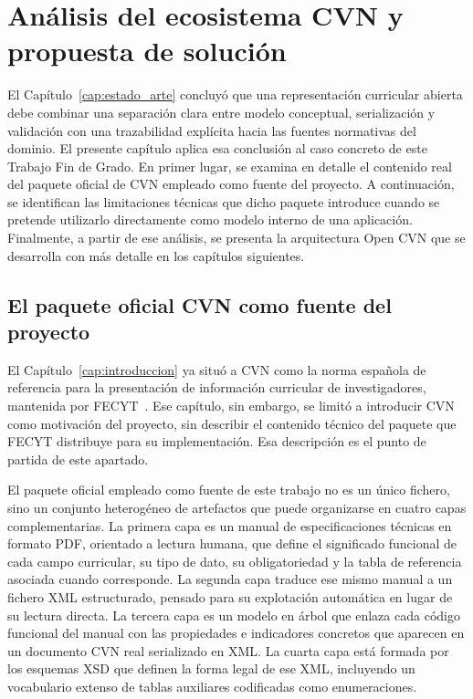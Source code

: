 \chapter{Análisis del ecosistema CVN y propuesta de solución}
\label{cap:ecosistema_cvn}

El Capítulo~\ref{cap:estado_arte} concluyó que una representación curricular
abierta debe combinar una separación clara entre modelo conceptual,
serialización y validación con una trazabilidad explícita hacia las fuentes
normativas del dominio. El presente capítulo aplica esa conclusión al caso
concreto de este Trabajo Fin de Grado. En primer lugar, se examina en detalle el
contenido real del paquete oficial de CVN empleado como fuente del proyecto. A
continuación, se identifican las limitaciones técnicas que dicho paquete
introduce cuando se pretende utilizarlo directamente como modelo interno de una
aplicación. Finalmente, a partir de ese análisis, se presenta la arquitectura
Open CVN que se desarrolla con más detalle en los capítulos siguientes.

\section{El paquete oficial CVN como fuente del proyecto}
\label{sec:ecosistema_paquete_oficial}

El Capítulo~\ref{cap:introduccion} ya situó a CVN como la norma española de
referencia para la presentación de información curricular de investigadores,
mantenida por FECYT~\cite{cvn_web}. Ese capítulo, sin embargo, se limitó a
introducir CVN como motivación del proyecto, sin describir el contenido técnico
del paquete que FECYT distribuye para su implementación. Esa descripción es el
punto de partida de este apartado.

El paquete oficial empleado como fuente de este trabajo no es un único fichero,
sino un conjunto heterogéneo de artefactos que puede organizarse en cuatro
capas complementarias. La primera capa es un manual de especificaciones técnicas
en formato PDF, orientado a lectura humana, que define el significado funcional
de cada campo curricular, su tipo de dato, su obligatoriedad y la tabla de
referencia asociada cuando corresponde. La segunda capa traduce ese mismo manual
a un fichero XML estructurado, pensado para su explotación automática en lugar
de su lectura directa. La tercera capa es un modelo en árbol que enlaza cada
código funcional del manual con las propiedades e indicadores concretos que
aparecen en un documento CVN real serializado en XML. La cuarta capa está
formada por los esquemas XSD que definen la forma legal de ese XML, incluyendo
un vocabulario extenso de tablas auxiliares codificadas como enumeraciones.

